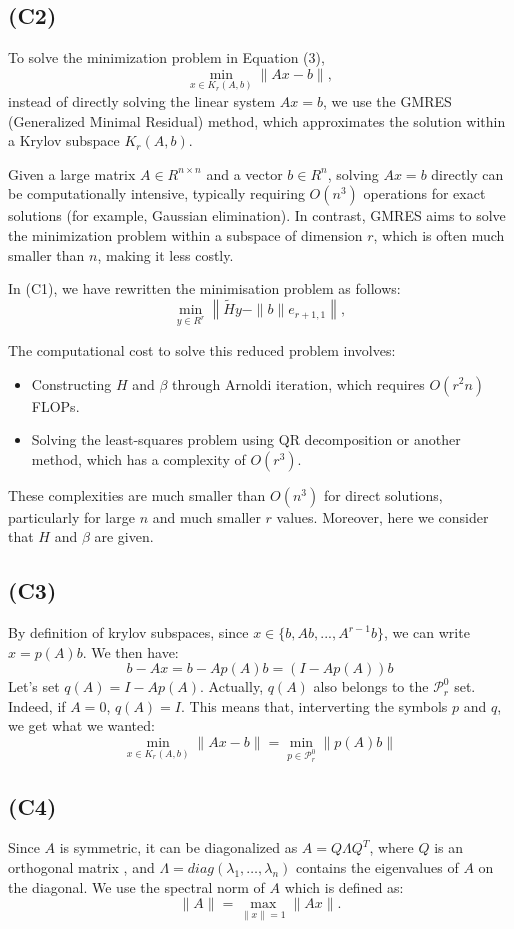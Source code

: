 \documentclass{article}
\begin{document}
\subsection*{(C2)}

To solve the minimization problem in Equation (3),
\[
\min_{x \in K_r(A, b)} \|Ax - b\|,
\]
instead of directly solving the linear system $ Ax = b $, we use the GMRES (Generalized Minimal Residual) method, which approximates the solution within a Krylov subspace $ K_r(A, b) $. 

Given a large matrix $ A \in R^{n \times n} $ and a vector $ b \in R^n $, solving $ Ax = b $ directly can be computationally intensive, 
typically requiring $ O(n^3) $ operations for exact solutions (for example, Gaussian elimination). In contrast, GMRES aims to solve the minimization problem within a subspace 
of dimension $ r $, which is often much smaller than $ n $, making it less costly.

In (C1), we have rewritten the minimisation problem as follows: 
\[
\min_{y \in R^r} \left\| \tilde{H} y - \|b\| e_{r+1,1} \right\|,
\]



The computational cost to solve this reduced problem involves:
\begin{itemize}
    \item Constructing $ H $ and $ \beta $ through Arnoldi iteration, which requires $ O(r^2 n) $ FLOPs.
    \item Solving the least-squares problem using QR decomposition or another method,
     which has a complexity of $ O(r^3) $.
\end{itemize}
These complexities are much smaller than $ O(n^3) $ for direct solutions, particularly for large $ n $ and much smaller $ r $ values. Moreover, 
here we consider that $H$ and $\beta$ are given. 

\subsection*{(C3)}
By definition of krylov subspaces, since $x \in \{b, Ab, ..., A^{r-1}b\}$, 
we can write $x=p(A)b$. We then have:
\[
b -Ax = b - A p(A)b = (I-A p(A))b 
\]
Let's set $q(A) = I-A p(A)$. Actually, $q(A)$ also belongs to the
 $\mathcal{P}_r^0$ set. Indeed, if $A = 0$, $q(A) = I$. This means that, interverting the symbols $p$ and $q$, 
 we get what we wanted: 
 \[
\min_{x \in K_r(A, b)} \|Ax - b\|  = \min_{p \in \mathcal{P}_r^0} \|p(A)b\|
 \]

\subsection*{(C4)}
Since $ A $ is symmetric, it can be diagonalized as $ A = Q \Lambda Q^T $, 
where $ Q $ is an orthogonal matrix , and $ \Lambda = diag(\lambda_1, \dots, \lambda_n) $ contains the eigenvalues of $ A $ on the diagonal.
We use the spectral norm of $ A $ which is defined as:
   \[
   \|A\| = \max_{\|x\| = 1} \|Ax\|.
   \]
\end{document}
